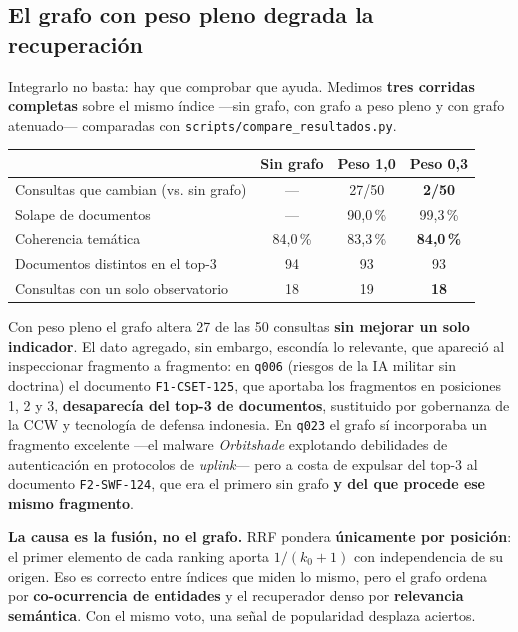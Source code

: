 \documentclass[10pt,a4paper]{article}
\begin{document}
\subsection{El grafo con peso pleno degrada la recuperación}

Integrarlo no basta: hay que comprobar que ayuda. Medimos \textbf{tres corridas completas} sobre el
mismo índice —sin grafo, con grafo a peso pleno y con grafo atenuado— comparadas con
\texttt{scripts/compare\_resultados.py}.

\begin{center}
\small
\begin{tabular}{lccc}
\toprule
& \textbf{Sin grafo} & \textbf{Peso 1,0} & \textbf{Peso 0,3} \\
\midrule
Consultas que cambian (vs. sin grafo) & --- & 27/50 & \textbf{2/50} \\
Solape de documentos                  & --- & 90,0\,\% & 99,3\,\% \\
Coherencia temática                   & 84,0\,\% & 83,3\,\% & \textbf{84,0\,\%} \\
Documentos distintos en el top-3      & 94 & 93 & 93 \\
Consultas con un solo observatorio    & 18 & 19 & \textbf{18} \\
\bottomrule
\end{tabular}
\end{center}

Con peso pleno el grafo altera 27 de las 50 consultas \textbf{sin mejorar un solo indicador}. El
dato agregado, sin embargo, escondía lo relevante, que apareció al inspeccionar fragmento a
fragmento: en \texttt{q006} (riesgos de la IA militar sin doctrina) el documento
\texttt{F1-CSET-125}, que aportaba los fragmentos en posiciones 1, 2 y 3, \textbf{desaparecía del
top-3 de documentos}, sustituido por gobernanza de la CCW y tecnología de defensa indonesia. En
\texttt{q023} el grafo sí incorporaba un fragmento excelente —el malware \emph{Orbitshade}
explotando debilidades de autenticación en protocolos de \emph{uplink}— pero a costa de expulsar
del top-3 al documento \texttt{F2-SWF-124}, que era el primero sin grafo \textbf{y del que procede
ese mismo fragmento}.

\textbf{La causa es la fusión, no el grafo.} RRF pondera \textbf{únicamente por posición}: el primer
elemento de cada ranking aporta $1/(k_0+1)$ con independencia de su origen. Eso es correcto entre
índices que miden lo mismo, pero el grafo ordena por \textbf{co-ocurrencia de entidades} y el
recuperador denso por \textbf{relevancia semántica}. Con el mismo voto, una señal de popularidad
desplaza aciertos.
\end{document}
